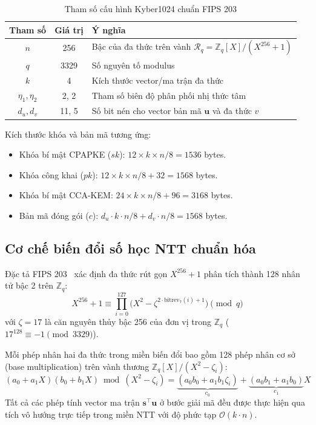 \documentclass[../LuanVan.tex]{subfiles}
\begin{document}
\begin{table}[H]
\centering
\caption{Tham số cấu hình Kyber1024 chuẩn FIPS 203}
\label{tab:kyber_params}
\begin{tabular}{c c l}
\toprule
\textbf{Tham số} & \textbf{Giá trị} & \textbf{Ý nghĩa} \\
\midrule
$n$ & 256 & Bậc của đa thức trên vành $\mathcal{R}_q = \mathbb{Z}_q[X]/(X^{256}+1)$ \\
$q$ & 3329 & Số nguyên tố modulus \\
$k$ & 4 & Kích thước vector/ma trận đa thức \\
$\eta_1, \eta_2$ & 2, 2 & Tham số biên độ phân phối nhị thức tâm \\
$d_u, d_v$ & 11, 5 & Số bit nén cho vector bản mã $\mathbf{u}$ và đa thức $v$ \\
\bottomrule
\end{tabular}
\end{table}

Kích thước khóa và bản mã tương ứng:
\begin{itemize}[leftmargin=2cm]
    \item Khóa bí mật CPAPKE ($sk$): $12 \times k \times n / 8 = 1536$ bytes.
    \item Khóa công khai ($pk$): $12 \times k \times n / 8 + 32 = 1568$ bytes.
    \item Khóa bí mật CCA-KEM: $24 \times k \times n / 8 + 96 = 3168$ bytes.
    \item Bản mã đóng gói ($c$): $d_u \cdot k \cdot n / 8 + d_v \cdot n / 8 = 1568$ bytes.
\end{itemize}

\subsection{Cơ chế biến đổi số học NTT chuẩn hóa}

Đặc tả FIPS 203~\cite{FIPS203} xác định đa thức rút gọn $X^{256} + 1$ phân tích thành 128 nhân tử bậc 2 trên $\mathbb{Z}_q$:
\begin{equation}
X^{256} + 1 \equiv \prod_{i=0}^{127} \bigl(X^2 - \zeta^{2\cdot \text{bitrev}_7(i)+1}\bigr) \pmod q
\end{equation}
với $\zeta = 17$ là căn nguyên thủy bậc 256 của đơn vị trong $\mathbb{Z}_q$ ($17^{128} \equiv -1 \pmod{3329}$).

Mỗi phép nhân hai đa thức trong miền biến đổi bao gồm 128 phép nhân cơ sở (base multiplication) trên vành thương $\mathbb{Z}_q[X]/(X^2 - \zeta_i)$:
\begin{equation}
(a_0 + a_1 X)(b_0 + b_1 X) \bmod (X^2 - \zeta_i) = \underbrace{(a_0 b_0 + a_1 b_1 \zeta_i)}_{c_0} + \underbrace{(a_0 b_1 + a_1 b_0)}_{c_1} X
\end{equation}
Tất cả các phép tính vector ma trận $\mathbf{s}^\top \mathbf{u}$ ở bước giải mã đều được thực hiện qua tích vô hướng trực tiếp trong miền NTT với độ phức tạp $\mathcal{O}(k \cdot n)$.
\end{document}
